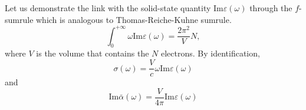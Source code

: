 \documentclass[aps,prb,reprint,showpacs]{revtex4-1}
\begin{document}
Let us demonstrate the link with the solid-state quantity $\mathrm{Im} \varepsilon(\omega)$
through the $f$-sumrule which is analogous to Thomas-Reiche-Kuhne sumrule.
\begin{equation}
 \int_0^{+\infty} \omega \mathrm{Im}\varepsilon(\omega) = \frac{2\pi^2}{V} N ,
\end{equation}
where $V$ is the volume that contains the $N$ electrons.
By identification, 
\begin{equation}
 \sigma(\omega) = \frac{V}{c} \omega \mathrm{Im}\varepsilon(\omega)
\end{equation}
and
\begin{equation}
 \mathrm{Im} \bar\alpha(\omega) = \frac{V}{4\pi} \mathrm{Im}\varepsilon(\omega)
\end{equation}
\end{document}
